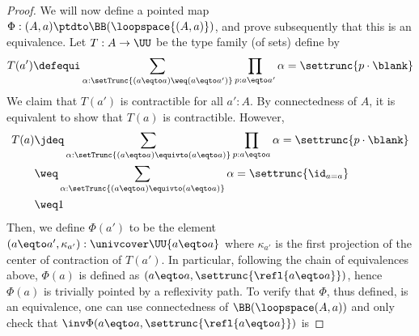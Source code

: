 \begin{proof}
  We will now define a pointed map
  $\Phi : (A,a) \ptdto \BB (\loopspace {(A,a)})$, and prove
  subsequently that this is an equivalence. Let $T : A \to \UU$ be the
  type family (of sets) define by
  \begin{displaymath}
    T(a') \defequi \sum_{\alpha:\setTrunc{(a\eqto a)\weq(a\eqto a')}}
    \prod_{p:a\eqto a'}\alpha=\settrunc {p\cdot\blank}
  \end{displaymath}
  We claim that $T(a')$ is contractible for all $a':A$. By
  connectedness of $A$, it is equivalent to show that $T(a)$ is
  contractible. However,
  \begin{align*}
    T(a)
    &\jdeq \sum_{\alpha:\setTrunc{(a\eqto a)\equivto(a\eqto a)}}\prod_{p:a\eqto a}
      \alpha = \settrunc {p\cdot \blank}
    \\
    &\weq \sum_{\alpha:\setTrunc{(a\eqto a)\equivto(a\eqto a)}} \alpha = \settrunc{\id_{a=a}}
    \\
    &\weq 1
  \end{align*}
  Then, we define $\Phi (a')$ to be the element
  $(a\eqto a', \kappa_{a'}):\univcover \UU {a\eqto a}$ where
  $\kappa_{a'}$ is the first projection of the center of contraction
  of $T(a')$. In particular, following the chain of equivalences
  above, $\Phi(a)$ is defined as
  $(a\eqto a, \settrunc{\refl {a\eqto a}})$, hence $\Phi(a)$ is
  trivially pointed by a reflexivity path. To verify that $\Phi$, thus
  defined, is an equivalence, one can use connectedness of
  $\BB(\loopspace (A,a))$ and only check that
  $\inv\Phi(a\eqto a,\settrunc{\refl {a\eqto a}})$ is

\end{proof}
